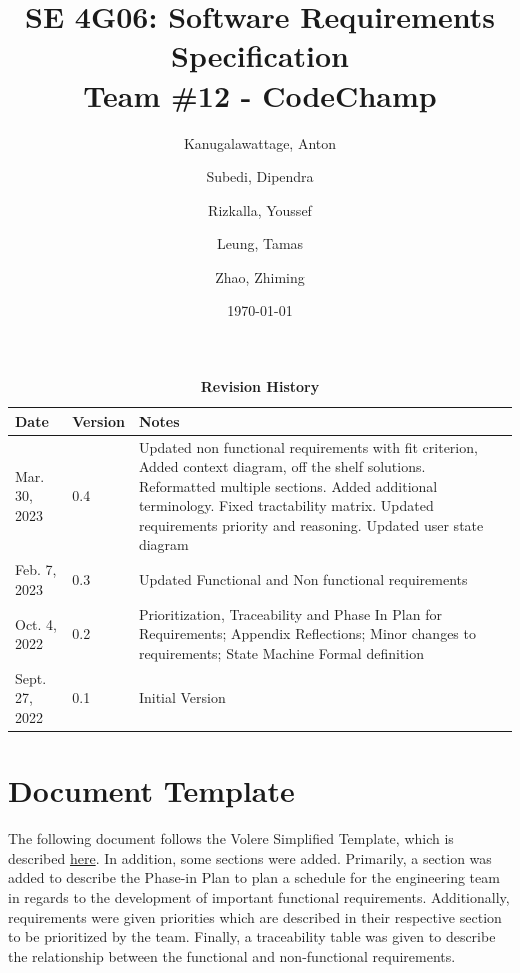 \documentclass[12pt, titlepage]{article}
\title{SE 4G06: Software Requirements Specification\\Team \#12 - CodeChamp}
\author{
  Kanugalawattage, Anton
  \and
  Subedi, Dipendra
  \and
  Rizkalla, Youssef
  \and
  Leung, Tamas
  \and
  Zhao, Zhiming
}
\date{\today}
\begin{document}
\maketitle


\begin{table}[h]
\caption{\bf Revision History}
\begin{tabularx}{\textwidth}{p{3cm}p{2cm}X}
\toprule {\bf Date} & {\bf Version} & {\bf Notes}\\
\midrule
Mar. 30, 2023& 0.4 & Updated non functional requirements with fit criterion, Added context diagram, off the shelf solutions. Reformatted multiple sections. Added additional terminology. Fixed tractability matrix. Updated requirements priority and reasoning. Updated user state diagram\\
Feb. 7, 2023& 0.3 & Updated Functional and Non functional requirements\\
Oct. 4, 2022 & 0.2 & Prioritization, Traceability and Phase In Plan for Requirements; Appendix Reflections; Minor changes to requirements; State Machine Formal definition\\
Sept. 27, 2022 & 0.1 & Initial Version\\
\bottomrule
\end{tabularx}
\end{table}

\newpage

\tableofcontents
\listoftables
\listoffigures

\newpage


\section*{Document Template}
The following document follows the Volere Simplified Template, which is described  \href{https://gitlab.cas.mcmaster.ca/smiths/se3xa3/tree/master/BlankProjectTemplate/Doc/SRS}{here}. In addition, some sections were added. Primarily, a section was added to describe the Phase-in Plan to plan a schedule for the engineering team in regards to the development of important functional requirements. Additionally, requirements were given priorities which are described in their respective section to be prioritized by the team. Finally, a traceability table was given to describe the relationship between the functional and non-functional requirements.
\end{document}
